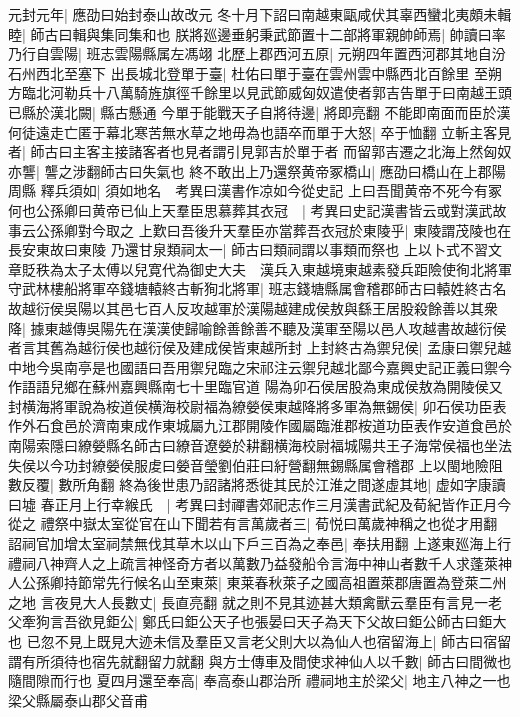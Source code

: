 元封元年|{
	應劭曰始封泰山故改元}
冬十月下詔曰南越東甌咸伏其辜西蠻北夷頗未輯睦|{
	師古曰輯與集同集和也}
朕將廵邊垂躬秉武節置十二部將軍親帥師焉|{
	帥讀曰率}
乃行自雲陽|{
	班志雲陽縣属左馮翊}
北歷上郡西河五原|{
	元朔四年置西河郡其地自汾石州西北至塞下}
出長城北登單于臺|{
	杜佑曰單于臺在雲州雲中縣西北百餘里}
至朔方臨北河勒兵十八萬騎旌旗徑千餘里以見武節威匈奴遣使者郭吉告單于曰南越王頭已縣於漢北闕|{
	縣古懸通}
今單于能戰天子自將待邊|{
	將即亮翻}
不能即南面而臣於漢何徒遠走亡匿于幕北寒苦無水草之地毋為也語卒而單于大怒|{
	卒于恤翻}
立斬主客見者|{
	師古曰主客主接諸客者也見者謂引見郭吉於單于者}
而留郭吉遷之北海上然匈奴亦讋|{
	讋之涉翻師古曰失氣也}
終不敢出上乃還祭黄帝冢橋山|{
	應劭曰橋山在上郡陽周縣}
釋兵須如|{
	須如地名　考異曰漢書作凉如今從史記}
上曰吾聞黄帝不死今有冢何也公孫卿曰黄帝已仙上天羣臣思慕葬其衣冠　|{
	考異曰史記漢書皆云或對漢武故事云公孫卿對今取之}
上歎曰吾後升天羣臣亦當葬吾衣冠於東陵乎|{
	東陵謂茂陵也在長安東故曰東陵}
乃還甘泉類祠太一|{
	師古曰類祠謂以事類而祭也}
上以卜式不習文章貶秩為太子太傅以兒寛代為御史大夫　漢兵入東越境東越素發兵距險使徇北將軍守武林樓船將軍卒錢塘轅終古斬狥北將軍|{
	班志錢塘縣属會稽郡師古曰轅姓終古名}
故越衍侯吳陽以其邑七百人反攻越軍於漢陽越建成侯敖與繇王居股殺餘善以其衆降|{
	據東越傳吳陽先在漢漢使歸喻餘善餘善不聽及漢軍至陽以邑人攻越書故越衍侯者言其舊為越衍侯也越衍侯及建成侯皆東越所封}
上封終古為禦兒侯|{
	孟康曰禦兒越中地今吳南亭是也國語曰吾用禦兒臨之宋祁注云禦兒越北鄙今嘉興史記正義曰禦今作語語兒鄉在蘇州嘉興縣南七十里臨官道}
陽為卯石侯居股為東成侯敖為開陵侯又封横海將軍說為桉道侯横海校尉福為繚嫈侯東越降將多軍為無錫侯|{
	卯石侯功臣表作外石食邑於濟南東成作東城屬九江郡開陵作國屬臨淮郡桉道功臣表作安道食邑於南陽索隱曰繚嫈縣名師古曰繚音遼嫈於耕翻横海校尉福城陽共王子海常侯福也坐法失侯以今功封繚嫈侯服䖍曰嫈音瑩劉伯莊曰紆營翻無錫縣属會稽郡}
上以閩地險阻數反覆|{
	數所角翻}
終為後世患乃詔諸將悉徙其民於江淮之間遂虛其地|{
	虚如字康讀曰墟}
春正月上行幸緱氏　|{
	考異曰封禪書郊祀志作三月漢書武紀及荀紀皆作正月今從之}
禮祭中嶽太室從官在山下聞若有言萬歲者三|{
	荀悦曰萬歲神稱之也從才用翻}
詔祠官加增太室祠禁無伐其草木以山下戶三百為之奉邑|{
	奉扶用翻}
上遂東廵海上行禮祠八神齊人之上疏言神怪奇方者以萬數乃益發船令言海中神山者數千人求蓬萊神人公孫卿持節常先行候名山至東萊|{
	東莱春秋萊子之國高祖置萊郡唐置為登萊二州之地}
言夜見大人長數丈|{
	長直亮翻}
就之則不見其迹甚大類禽獸云羣臣有言見一老父牽狗言吾欲見鉅公|{
	鄭氏曰鉅公天子也張晏曰天子為天下父故曰鉅公師古曰鉅大也}
已忽不見上既見大迹未信及羣臣又言老父則大以為仙人也宿留海上|{
	師古曰宿留謂有所須待也宿先就翻留力就翻}
與方士傳車及間使求神仙人以千數|{
	師古曰間微也隨間隙而行也}
夏四月還至奉高|{
	奉高泰山郡治所}
禮祠地主於梁父|{
	地主八神之一也梁父縣屬泰山郡父音甫}
